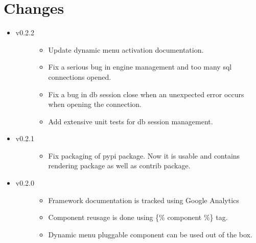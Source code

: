 \documentclass[letterpaper,10pt,english]{sphinxmanual}
\begin{document}
\chapter{Changes}
\label{changes:changes}\label{changes::doc}\begin{itemize}
\item {} \begin{description}
\item[{v0.2.2}] \leavevmode\begin{itemize}
\item {} 
Update dynamic menu activation documentation.

\item {} 
Fix a serious bug in engine management and too many sql connections opened.

\item {} 
Fix a bug in db session close when an unexpected error occurs when opening the connection.

\item {} 
Add extensive unit tests for db session management.

\end{itemize}

\end{description}

\item {} \begin{description}
\item[{v0.2.1}] \leavevmode\begin{itemize}
\item {} 
Fix packaging of pypi package. Now it is usable and contains rendering package as well as contrib package.

\end{itemize}

\end{description}

\item {} \begin{description}
\item[{v0.2.0}] \leavevmode\begin{itemize}
\item {} 
Framework documentation is tracked using Google Analytics

\item {} 
Component reusage is done using \{\% component \%\} tag.

\item {} 
Dynamic menu pluggable component can be used out of the box.


\end{itemize}
\end{description}
\end{itemize}
\end{document}
